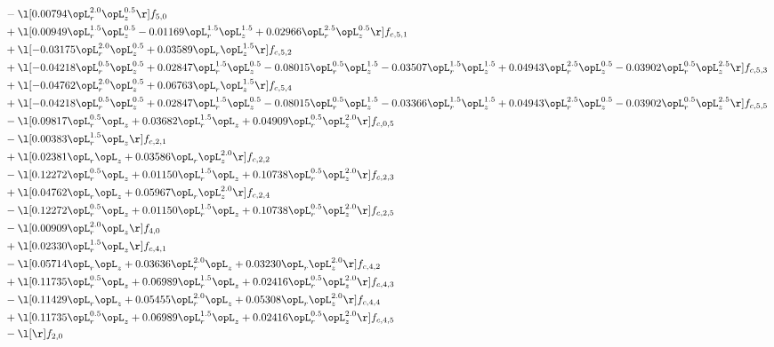 \begin{alignat}{2}
& - \l[  0.00794 \opL_r^{2.0} \opL_z^{0.5}  \r] f_{5,0} \nonumber \\ 
& + \l[  0.00949 \opL_r^{1.5} \opL_z^{0.5}   -0.01169 \opL_r^{1.5} \opL_z^{1.5} +  0.02966 \opL_r^{2.5} \opL_z^{0.5}  \r] f_{c,5,1} \nonumber \\ 
& + \l[  -0.03175 \opL_r^{2.0} \opL_z^{0.5} +  0.03589 \opL_r \opL_z^{1.5}  \r] f_{c,5,2} \nonumber \\ 
& + \l[  -0.04218 \opL_r^{0.5} \opL_z^{0.5} +  0.02847 \opL_r^{1.5} \opL_z^{0.5}   -0.08015 \opL_r^{0.5} \opL_z^{1.5}   -0.03507 \opL_r^{1.5} \opL_z^{1.5} +  0.04943 \opL_r^{2.5} \opL_z^{0.5}   -0.03902 \opL_r^{0.5} \opL_z^{2.5}  \r] f_{c,5,3} \nonumber \\ 
& + \l[  -0.04762 \opL_r^{2.0} \opL_z^{0.5} +  0.06763 \opL_r \opL_z^{1.5}  \r] f_{c,5,4} \nonumber \\ 
& + \l[  -0.04218 \opL_r^{0.5} \opL_z^{0.5} +  0.02847 \opL_r^{1.5} \opL_z^{0.5}   -0.08015 \opL_r^{0.5} \opL_z^{1.5}   -0.03366 \opL_r^{1.5} \opL_z^{1.5} +  0.04943 \opL_r^{2.5} \opL_z^{0.5}   -0.03902 \opL_r^{0.5} \opL_z^{2.5}  \r] f_{c,5,5} \nonumber \\ 
& - \l[  0.09817 \opL_r^{0.5} \opL_z +  0.03682 \opL_r^{1.5} \opL_z +  0.04909 \opL_r^{0.5} \opL_z^{2.0}  \r] f_{c,0,5} \nonumber \\ 
& - \l[  0.00383 \opL_r^{1.5} \opL_z  \r] f_{c,2,1} \nonumber \\ 
& + \l[  0.02381 \opL_r \opL_z +  0.03586 \opL_r \opL_z^{2.0}  \r] f_{c,2,2} \nonumber \\ 
& - \l[  0.12272 \opL_r^{0.5} \opL_z +  0.01150 \opL_r^{1.5} \opL_z +  0.10738 \opL_r^{0.5} \opL_z^{2.0}  \r] f_{c,2,3} \nonumber \\ 
& + \l[  0.04762 \opL_r \opL_z +  0.05967 \opL_r \opL_z^{2.0}  \r] f_{c,2,4} \nonumber \\ 
& - \l[  0.12272 \opL_r^{0.5} \opL_z +  0.01150 \opL_r^{1.5} \opL_z +  0.10738 \opL_r^{0.5} \opL_z^{2.0}  \r] f_{c,2,5} \nonumber \\ 
& - \l[  0.00909 \opL_r^{2.0} \opL_z  \r] f_{4,0} \nonumber \\ 
& + \l[  0.02330 \opL_r^{1.5} \opL_z  \r] f_{c,4,1} \nonumber \\ 
& - \l[  0.05714 \opL_r \opL_z +  0.03636 \opL_r^{2.0} \opL_z +  0.03230 \opL_r \opL_z^{2.0}  \r] f_{c,4,2} \nonumber \\ 
& + \l[  0.11735 \opL_r^{0.5} \opL_z +  0.06989 \opL_r^{1.5} \opL_z +  0.02416 \opL_r^{0.5} \opL_z^{2.0}  \r] f_{c,4,3} \nonumber \\ 
& - \l[  0.11429 \opL_r \opL_z +  0.05455 \opL_r^{2.0} \opL_z +  0.05308 \opL_r \opL_z^{2.0}  \r] f_{c,4,4} \nonumber \\ 
& + \l[  0.11735 \opL_r^{0.5} \opL_z +  0.06989 \opL_r^{1.5} \opL_z +  0.02416 \opL_r^{0.5} \opL_z^{2.0}  \r] f_{c,4,5} \nonumber \\ 
& - \l[  \r] f_{2,0} \nonumber \\ 
\end{alignat} 


